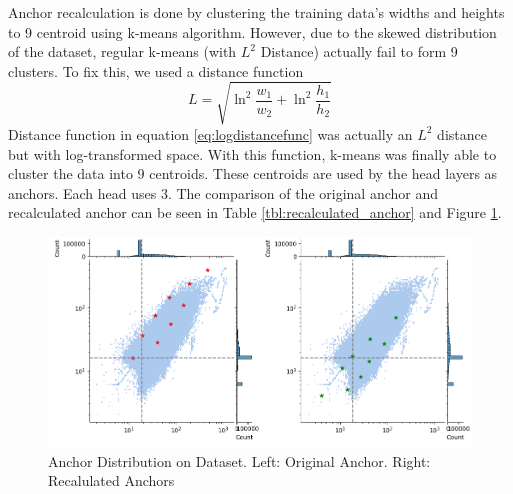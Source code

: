 Anchor recalculation is done by clustering the training data's widths and heights to 9 centroid using k-means algorithm.
However, due to the skewed distribution of the dataset, regular k-means (with $L^2$ Distance) actually fail to form 9 clusters.
To fix this, we used a distance function
\begin{equation} 
  L = \sqrt{\ln^2{\frac{w_1}{w_2}} + \ln^2{\frac{h_1}{h_2}}}
  \label{eq:logdistancefunc}
\end{equation}
Distance function in equation \ref{eq:logdistancefunc} was actually an $L^2$ distance but with log-transformed space.
With this function, k-means was finally able to cluster the data into 9 centroids.
These centroids are used by the head layers as anchors. Each head uses 3.
The comparison of the original anchor and recalculated anchor can be seen in Table \ref{tbl:recalculated_anchor}
and Figure \ref{fig:anchor-dist}.

\begin{table}[H]
  \centering
  \label{tbl:recalculated_anchor}
  \vspace{-1ex}
  
\end{table}
\vspace{1ex}

\begin{figure}[H]
  \centering
  \includegraphics[width=\textwidth]{figures/anchor-dist-2.png}
  \caption{Anchor Distribution on Dataset. Left: Original Anchor. Right: Recalulated Anchors}
  \label{fig:anchor-dist}
\end{figure}

